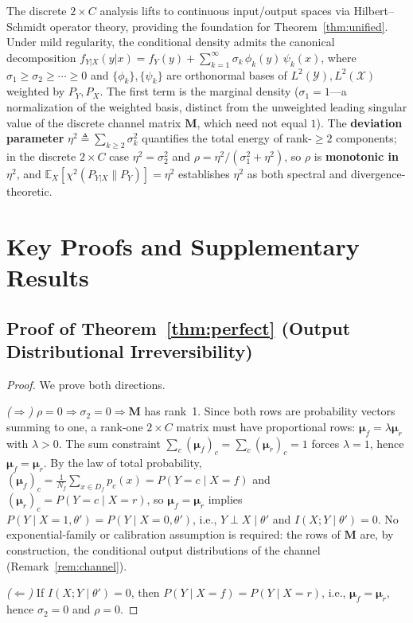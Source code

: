 \documentclass[smallextended]{svjour3}       %
\newcommand{\coloneqq}{\triangleq}
\begin{document}
The discrete $2\times C$ analysis lifts to continuous input/output spaces via Hilbert--Schmidt operator theory, providing the foundation for Theorem~\ref{thm:unified}. Under mild regularity, the conditional density admits the canonical decomposition $f_{Y|X}(y|x)=f_Y(y)+\sum_{k=1}^{\infty}\sigma_k\,\phi_k(y)\,\psi_k(x)$, where $\sigma_1\ge\sigma_2\ge\cdots\ge0$ and $\{\phi_k\},\{\psi_k\}$ are orthonormal bases of $L^2(\mathcal{Y}),L^2(\mathcal{X})$ weighted by $P_Y,P_X$. The first term is the marginal density ($\sigma_1=1$---a normalization of the weighted basis, distinct from the unweighted leading singular value of the discrete channel matrix $\mathbf{M}$, which need not equal $1$). The \textbf{deviation parameter} $\eta^2\coloneqq\sum_{k\ge2}\sigma_k^2$ quantifies the total energy of rank-$\ge2$ components; in the discrete $2\times C$ case $\eta^2=\sigma_2^2$ and $\rho=\eta^2/(\sigma_1^2+\eta^2)$, so $\rho$ is \textbf{monotonic in $\eta^2$}, and $\mathbb{E}_X[\chi^2(P_{Y|X}\|P_Y)]=\eta^2$ establishes $\eta^2$ as both spectral and divergence-theoretic.

\section{Key Proofs and Supplementary Results}
\label{sec:appendix}

\subsection{Proof of Theorem~\ref{thm:perfect} (Output Distributional Irreversibility)}
\label{app:perfect}
\begin{proof}
We prove both directions.

\noindent\textit{($\Rightarrow$)} $\rho=0 \Rightarrow \sigma_2=0 \Rightarrow \mathbf{M}$ has rank~1. Since both rows are probability vectors summing to one, a rank-one $2\times C$ matrix must have proportional rows: $\boldsymbol{\mu}_f = \lambda \boldsymbol{\mu}_r$ with $\lambda>0$. The sum constraint $\sum_c (\boldsymbol{\mu}_f)_c = \sum_c (\boldsymbol{\mu}_r)_c = 1$ forces $\lambda=1$, hence $\boldsymbol{\mu}_f = \boldsymbol{\mu}_r$. By the law of total probability, $(\boldsymbol{\mu}_f)_c = \frac{1}{N_f}\sum_{x\in D_f}p_c(x) = P(Y{=}c\mid X{=}f)$ and $(\boldsymbol{\mu}_r)_c = P(Y{=}c\mid X{=}r)$, so $\boldsymbol{\mu}_f=\boldsymbol{\mu}_r$ implies $P(Y\mid X=1,\theta') = P(Y\mid X=0,\theta')$, i.e., $Y\perp X\mid\theta'$ and $I(X;Y\mid\theta')=0$. No exponential-family or calibration assumption is required: the rows of $\mathbf{M}$ are, by construction, the conditional output distributions of the channel (Remark~\ref{rem:channel}).

\noindent\textit{($\Leftarrow$)} If $I(X;Y\mid\theta')=0$, then $P(Y\mid X{=}f)=P(Y\mid X{=}r)$, i.e., $\boldsymbol{\mu}_f = \boldsymbol{\mu}_r$, hence $\sigma_2=0$ and $\rho=0$.
\end{proof}
\end{document}
